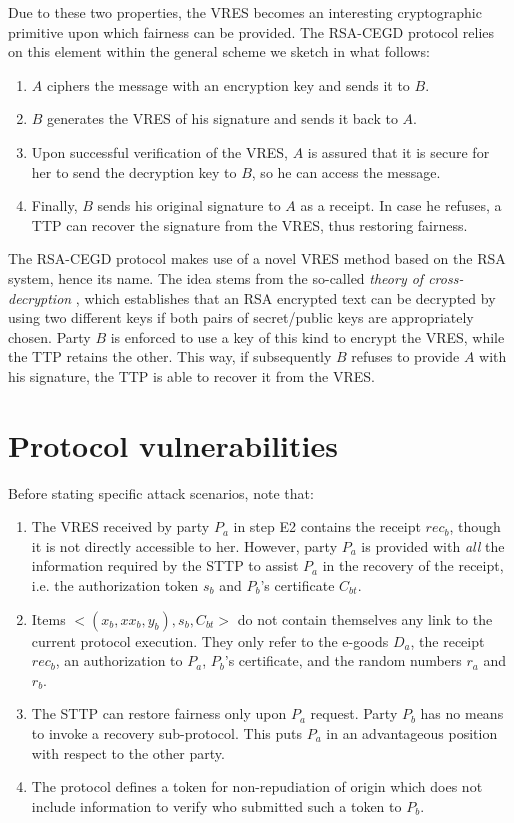 \documentclass{article}
\begin{document}
Due to these two properties, the VRES becomes an interesting
cryptographic primitive upon which fairness can be provided. The
RSA-CEGD protocol relies on this element within the general scheme
we sketch in what follows:

\begin{enumerate}
   \item $A$ ciphers the message with an encryption key and sends it to $B$.
   \item $B$ generates the VRES of his signature and sends it back to $A$.
   \item Upon successful verification of the VRES, $A$ is
   assured that it is secure for her to send the decryption key to
   $B$, so he can access the message.
   \item Finally, $B$ sends his original signature to $A$ as a
   receipt. In case he refuses, a TTP can recover the
   signature from the VRES, thus restoring fairness.
\end{enumerate}

The RSA-CEGD protocol makes use of a novel VRES method based on the
RSA system, hence its name. The idea stems from the so-called
\emph{theory of cross-decryption} \cite{RR00}, which establishes
that an RSA encrypted text can be decrypted by using two different
keys if both pairs of secret/public keys are appropriately chosen.
Party $B$ is enforced to use a key of this kind to encrypt the VRES,
while the TTP retains the other. This way, if subsequently $B$
refuses to provide $A$ with his signature, the TTP is able to
recover it from the VRES.

\section{Protocol vulnerabilities}\label{Sec:Vulnerabilities}
Before stating specific attack scenarios, note that:
\begin{enumerate}
    \item The VRES received by party $P_a$ in step E2 contains the
    receipt $rec_b$, though it is not directly accessible to her.
    However, party $P_a$ is provided with \emph{all}
    the information required by the STTP to assist $P_a$ in the
    recovery of the receipt, i.e. the authorization token $s_b$ and
    $P_b$'s certificate $C_{bt}$.
    \item Items $<(x_b, xx_b, y_b), s_b, C_{bt}>$ do not contain
    themselves any link to the current protocol execution. They only
    refer to the e-goods $D_a$, the receipt $rec_b$, an authorization to
    $P_a$, $P_b$'s certificate, and the random numbers $r_a$ and $r_b$.
    \item The STTP can restore fairness only upon $P_a$ request.
    Party $P_b$ has no means to invoke a recovery sub-protocol.
    This puts $P_a$ in an advantageous position with respect to the
    other party.
    \item The protocol defines a token for non-repudiation of origin which
    does not include information to verify who submitted such a token to
    $P_b$.

\end{enumerate}
\end{document}
